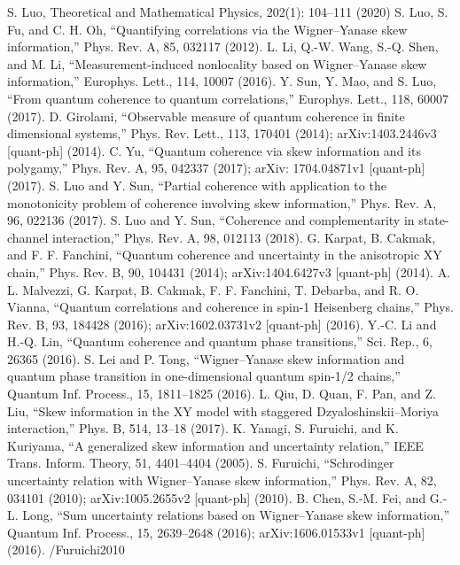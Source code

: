 \begin{thebibliography}{}
 S. Luo, Theoretical and Mathematical Physics, 202(1): 104–111 (2020)
 S. Luo, S. Fu, and C. H. Oh, “Quantifying correlations via the Wigner–Yanase skew information,” Phys. Rev. A,
85, 032117 (2012).
 L. Li, Q.-W. Wang, S.-Q. Shen, and M. Li, “Measurement-induced nonlocality based on Wigner–Yanase skew
information,” Europhys. Lett., 114, 10007 (2016).
 Y. Sun, Y. Mao, and S. Luo, “From quantum coherence to quantum correlations,” Europhys. Lett., 118, 60007
(2017).
 D. Girolami, “Observable measure of quantum coherence in finite dimensional systems,” Phys. Rev. Lett., 113,
170401 (2014); arXiv:1403.2446v3 [quant-ph] (2014).
 C. Yu, “Quantum coherence via skew information and its polygamy,” Phys. Rev. A, 95, 042337 (2017); arXiv:
1704.04871v1 [quant-ph] (2017).
 S. Luo and Y. Sun, “Partial coherence with application to the monotonicity problem of coherence involving skew
information,” Phys. Rev. A, 96, 022136 (2017).
 S. Luo and Y. Sun, “Coherence and complementarity in state-channel interaction,” Phys. Rev. A, 98, 012113
(2018).
 G. Karpat, B. Cakmak, and F. F. Fanchini, “Quantum coherence and uncertainty in the anisotropic XY chain,”
Phys. Rev. B, 90, 104431 (2014); arXiv:1404.6427v3 [quant-ph] (2014).
 A. L. Malvezzi, G. Karpat, B. Cakmak, F. F. Fanchini, T. Debarba, and R. O. Vianna, “Quantum correlations
and coherence in spin-1 Heisenberg chains,” Phys. Rev. B, 93, 184428 (2016); arXiv:1602.03731v2 [quant-ph]
(2016).
 Y.-C. Li and H.-Q. Lin, “Quantum coherence and quantum phase transitions,” Sci. Rep., 6, 26365 (2016).
 S. Lei and P. Tong, “Wigner–Yanase skew information and quantum phase transition in one-dimensional quantum spin-1/2 chains,” Quantum Inf. Process., 15, 1811–1825 (2016).
 L. Qiu, D. Quan, F. Pan, and Z. Liu, “Skew information in the XY model with staggered Dzyaloshinskii–Moriya
interaction,” Phys. B, 514, 13–18 (2017).
 K. Yanagi, S. Furuichi, and K. Kuriyama, “A generalized skew information and uncertainty relation,” IEEE Trans. Inform. Theory, 51, 4401–4404 (2005).
 S. Furuichi, “Schrodinger uncertainty relation with Wigner–Yanase skew information,” Phys. Rev. A, 82, 034101 (2010); arXiv:1005.2655v2 [quant-ph] (2010).
 B. Chen, S.-M. Fei, and G.-L. Long, “Sum uncertainty relations based on Wigner–Yanase skew information,” Quantum Inf. Process., 15, 2639–2648 (2016); arXiv:1606.01533v1 [quant-ph] (2016).
/Furuichi2010



\end{thebibliography}
